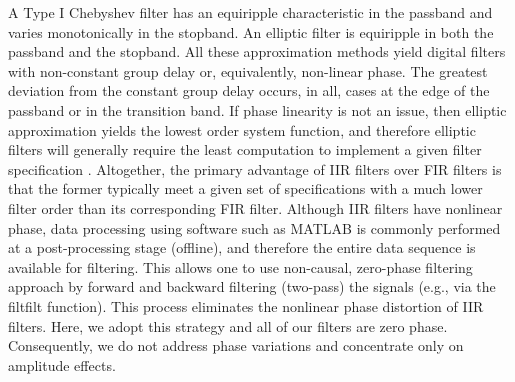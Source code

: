 A Type I Chebyshev filter has an equiripple characteristic in the passband and varies monotonically in the stopband. An elliptic filter is equiripple in both the passband and the stopband. All these approximation methods yield digital filters with non-constant group delay or, equivalently, non-linear phase. The greatest deviation from the constant group delay occurs, in all, cases at the edge of the passband or in the transition band. If phase linearity is not an issue, then elliptic approximation yields the lowest order system function, and therefore elliptic filters will generally require the least computation to implement a given filter specification \citep{Oppenheim_1989}. Altogether, the primary advantage of IIR filters over FIR filters is that the former typically meet a given set of specifications with a much lower filter order than its corresponding FIR filter. Although IIR filters have nonlinear phase, data processing using software such as MATLAB is commonly performed at a post-processing stage (offline), and therefore the entire data sequence is available for filtering. This allows one to use non-causal, zero-phase filtering approach by forward and backward filtering (two-pass) the signals (e.g., via the filtfilt function). This process eliminates the nonlinear phase distortion of IIR filters. Here, we adopt this strategy and all of our filters are zero phase. Consequently, we do not address phase variations and concentrate only on amplitude effects.
